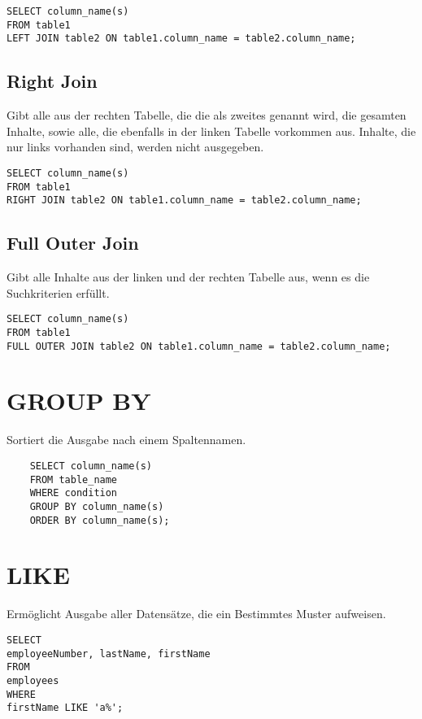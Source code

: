 \documentclass[fleqn,10pt]{SelfArx} %
\begin{document}
\begin{verbatim}
SELECT column_name(s)
FROM table1
LEFT JOIN table2 ON table1.column_name = table2.column_name; 
\end{verbatim}
\subsection{Right Join}

Gibt alle aus der rechten Tabelle, die die als zweites genannt wird, die gesamten Inhalte, sowie alle, die ebenfalls in der linken Tabelle vorkommen aus. Inhalte, die nur links vorhanden sind, werden nicht ausgegeben. 
\begin{verbatim}
SELECT column_name(s)
FROM table1
RIGHT JOIN table2 ON table1.column_name = table2.column_name; 
\end{verbatim}

\subsection{Full Outer Join}

Gibt alle Inhalte aus der linken und der rechten Tabelle aus, wenn es die Suchkriterien erfüllt.
\begin{verbatim}
SELECT column_name(s)
FROM table1
FULL OUTER JOIN table2 ON table1.column_name = table2.column_name;
\end{verbatim}




\section{GROUP BY}
Sortiert die Ausgabe nach einem Spaltennamen.

\begin{verbatim}
	SELECT column_name(s)
	FROM table_name
	WHERE condition
	GROUP BY column_name(s)
	ORDER BY column_name(s); 
\end{verbatim}


\section{LIKE}
Ermöglicht Ausgabe aller Datensätze, die ein Bestimmtes Muster aufweisen.
\begin{verbatim}
SELECT 
employeeNumber, lastName, firstName
FROM
employees
WHERE
firstName LIKE 'a%';
\end{verbatim}
\end{document}
